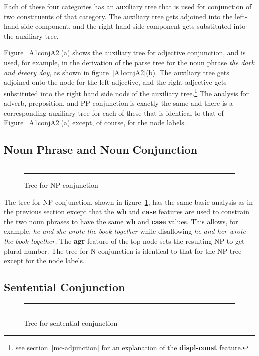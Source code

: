 Each of these four categories has an auxiliary tree that is used for
conjunction of two constituents of that category.  The auxiliary tree
gets adjoined into the left-hand-side component, and the right-hand-side
component gets substituted into the auxiliary tree.  

Figure~\ref{A1conjA2}(a)  shows the auxiliary tree for adjective conjunction,
and is used, for example, in the derivation of the parse tree for the 
noun phrase {\it the dark and dreary day}, as shown in
 figure~\ref{A1conjA2}(b).  The auxiliary tree gets adjoined onto the node for
the left adjective, and the right adjective gets substituted into the right
hand side node of the auxiliary
tree.\footnote{see section~\ref{mc-adjunction} for an explanation of the
{\bf displ-const} feature.}
The analysis for adverb, preposition, and PP conjunction is exactly the
same and there is a corresponding auxiliary tree for each of these that
is identical to that of Figure~\ref{A1conjA2}(a) except, of course,
for the node labels.
\subsection{Noun Phrase and Noun Conjunction}

\begin{figure}[ht]
\centering
\rule[.1in]{5.0in}{0.01in}
\caption{Tree for NP conjunction}
\rule[.1in]{5.0in}{0.01in}
\label{NP1conjNP2}
\end{figure}

The tree for NP conjunction, shown in figure~\ref{NP1conjNP2}, has the
same basic analysis as in the previous section except that the {\bf wh}
and {\bf case} features are
used to constrain the two noun phrases to have the same {\bf wh} and 
{\bf case} values.
This allows, for example, {\it he and she wrote the book together} while
disallowing {\it he and her wrote the book together.} 
The {\bf agr} feature of the top node
sets the resulting NP to get plural number.  The  tree for N conjunction
is identical to that for the NP tree except for the node labels. 

\subsection{Sentential Conjunction}
\begin{figure}[ht]
\centering
\rule[.1in]{5.0in}{0.01in}
\caption{Tree for sentential conjunction}
\rule[.1in]{5.0in}{0.01in}
\label{S1conjS2}
\end{figure}

